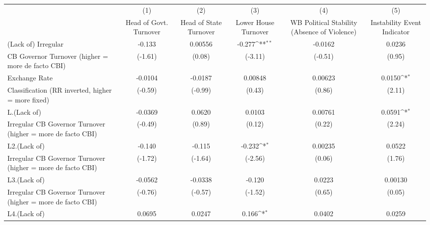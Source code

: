 {
\def\sym#1{\ifmmode^{#1}\else\(^{#1}\)\fi}
\begin{tabular}{l*{5}{c}}
\hline\hline
                    &\multicolumn{1}{c}{(1)}&\multicolumn{1}{c}{(2)}&\multicolumn{1}{c}{(3)}&\multicolumn{1}{c}{(4)}&\multicolumn{1}{c}{(5)}\\
                    &\multicolumn{1}{c}{Head of Govt. Turnover}&\multicolumn{1}{c}{Head of State Turnover}&\multicolumn{1}{c}{Lower House Turnover}&\multicolumn{1}{c}{WB Political Stability (Absence of Violence)}&\multicolumn{1}{c}{Instability Event Indicator}\\
\hline
(Lack of) Irregular &      -0.133         &     0.00556         &      -0.277\sym{**} &     -0.0162         &      0.0236         \\
CB Governor Turnover (higher = more de facto CBI)&     (-1.61)         &      (0.08)         &     (-3.11)         &     (-0.51)         &      (0.95)         \\
[1em]
Exchange Rate       &     -0.0104         &     -0.0187         &     0.00848         &     0.00623         &      0.0150\sym{*}  \\
Classification (RR inverted, higher = more fixed)&     (-0.59)         &     (-0.99)         &      (0.43)         &      (0.86)         &      (2.11)         \\
[1em]
L.(Lack of)         &     -0.0369         &      0.0620         &      0.0103         &     0.00761         &      0.0591\sym{*}  \\
Irregular CB Governor Turnover (higher = more de facto CBI)&     (-0.49)         &      (0.89)         &      (0.12)         &      (0.22)         &      (2.24)         \\
[1em]
L2.(Lack of)        &      -0.140         &      -0.115         &      -0.232\sym{*}  &     0.00235         &      0.0522         \\
Irregular CB Governor Turnover (higher = more de facto CBI)&     (-1.72)         &     (-1.64)         &     (-2.56)         &      (0.06)         &      (1.76)         \\
[1em]
L3.(Lack of)        &     -0.0562         &     -0.0338         &      -0.120         &      0.0223         &     0.00130         \\
Irregular CB Governor Turnover (higher = more de facto CBI)&     (-0.76)         &     (-0.57)         &     (-1.52)         &      (0.65)         &      (0.05)         \\
[1em]
L4.(Lack of)        &      0.0695         &      0.0247         &       0.166\sym{*}  &      0.0402         &      0.0259         \\

\end{tabular}}
